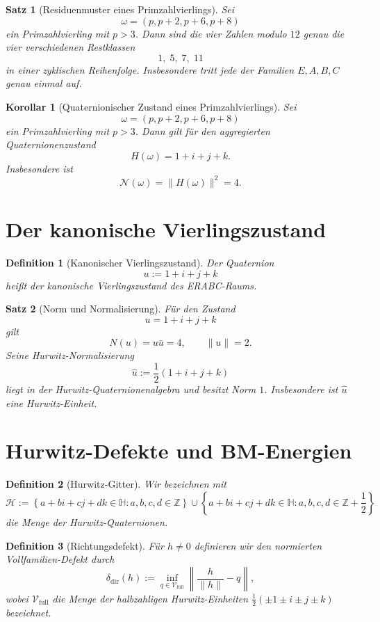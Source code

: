 \documentclass[11pt,a4paper]{article}
\newtheorem{satz}{Satz}
\newtheorem{definition}{Definition}
\newtheorem{korollar}{Korollar}
\begin{document}
\begin{satz}[Residuenmuster eines Primzahlvierlings]
Sei
\[
\omega=(p,p+2,p+6,p+8)
\]
ein Primzahlvierling mit $p>3$. Dann sind die vier Zahlen modulo $12$ genau die vier verschiedenen Restklassen
\[
1,\;5,\;7,\;11
\]
in einer zyklischen Reihenfolge. Insbesondere tritt jede der Familien $E,A,B,C$ genau einmal auf.
\end{satz}

\begin{korollar}[Quaternionischer Zustand eines Primzahlvierlings]
Sei
\[
\omega=(p,p+2,p+6,p+8)
\]
ein Primzahlvierling mit $p>3$. Dann gilt für den aggregierten Quaternionenzustand
\[
H(\omega)=1+i+j+k.
\]
Insbesondere ist
\[
\mathcal N(\omega)=\|H(\omega)\|^2=4.
\]
\end{korollar}

\section{Der kanonische Vierlingszustand}

\begin{definition}[Kanonischer Vierlingszustand]
Der Quaternion
\[
u:=1+i+j+k
\]
heißt der kanonische Vierlingszustand des ERABC-Raums.
\end{definition}

\begin{satz}[Norm und Normalisierung]
Für den Zustand
\[
u=1+i+j+k
\]
gilt
\[
N(u)=u\bar u=4,
\qquad
\|u\|=2.
\]
Seine Hurwitz-Normalisierung
\[
\hat u:=\frac12(1+i+j+k)
\]
liegt in der Hurwitz-Quaternionenalgebra und besitzt Norm $1$. Insbesondere ist $\hat u$ eine Hurwitz-Einheit.
\end{satz}

\section{Hurwitz-Defekte und BM-Energien}

\begin{definition}[Hurwitz-Gitter]
Wir bezeichnen mit
\[
\mathcal H
:=
\left\{
a+bi+cj+dk \in \mathbb H :
a,b,c,d\in\mathbb Z
\right\}
\cup
\left\{
a+bi+cj+dk \in \mathbb H :
a,b,c,d\in \mathbb Z+\frac12
\right\}
\]
die Menge der Hurwitz-Quaternionen.
\end{definition}

\begin{definition}[Richtungsdefekt]
Für $h\neq 0$ definieren wir den normierten Vollfamilien-Defekt durch
\[
\delta_{\mathrm{dir}}(h)
:=
\inf_{q\in\mathcal V_{\mathrm{full}}}
\left\|
\frac{h}{\|h\|}-q
\right\|,
\]
wobei $\mathcal V_{\mathrm{full}}$ die Menge der halbzahligen Hurwitz-Einheiten $\frac12(\pm1\pm i\pm j\pm k)$ bezeichnet.
\end{definition}
\end{document}
